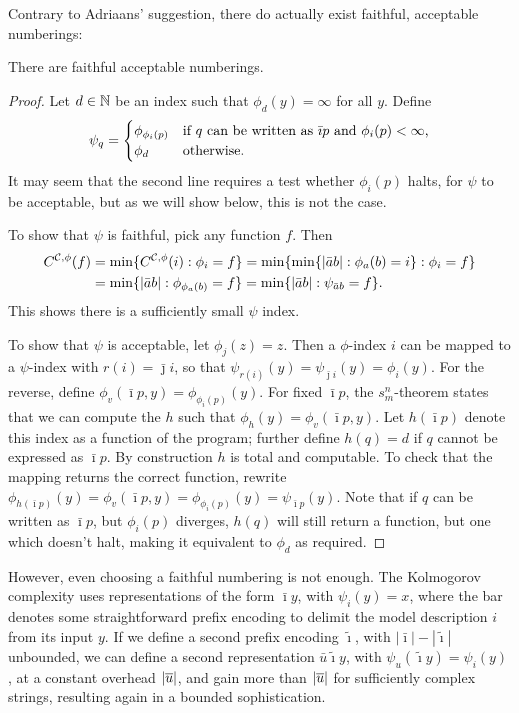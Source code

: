 
Contrary to Adriaans' suggestion, there do actually exist faithful, acceptable numberings:

\begin{lemma}\label{lemma:faithful-numberings}
  There are faithful acceptable numberings.
\end{lemma}

\begin{proof}
Let $d \in {\mathbb N}$ be an index such that $\phi_d(y)=\infty$ for all $y$. Define
\[
\psi_q=\begin{cases}
\phi_{\phi_i(p)}&\textnormal{if $q$ can be written as $\bar\imath p$ and $\phi_i(p)<\infty$,}\\
\phi_d&\textnormal{otherwise.}\end{cases}
\]
It may seem that the second line requires a test whether $\phi_i(p)$ halts, for $\psi$ to be acceptable, but as we will show below, this is not the case.  
  
To show that $\psi$ is faithful, pick any function $f$. Then
\[\begin{split}
C^{{\cal C}, \phi}(f)&=\min\{C^{{\cal C}, \phi}(i):\phi_i=f\} =\min\{\min\{|\bar a b|:\phi_a(b)=i\}:\phi_i=f\} \\
& =\min\{|\bar a b|:\phi_{\phi_a(b)}=f\}
 =\min\{|\bar a b|:\psi_{\bar a b}=f\}.
\end{split}\]
This shows there is a sufficiently small $\psi$ index.

To show that $\psi$ is acceptable, let $\phi_j(z)=z$. Then a $\phi$-index $i$ can be mapped to a $\psi$-index
with $r(i)=\bar\jmath i$, so that
$\psi_{r(i)}(y)=\psi_{\bar\jmath i}(y)=\phi_i(y)$. For the reverse,
define $\phi_v(\bar\imath p, y)=\phi_{\phi_i(p)}(y)$. For fixed
$\bar\imath p$, the 
$s^n_m$-theorem \cite{kleene193notation} states that we can compute the $h$
such that $\phi_h(y)=\phi_v(\bar\imath p,y)$. Let $h(\bar\imath p)$
denote this index as a function of the program; further define
$h(q)=d$ if $q$ cannot be expressed as $\bar\imath p$. By
construction $h$ is total and computable. To check that the mapping
returns the correct function, rewrite $\phi_{h(\bar\imath
  p)}(y)=\phi_v(\bar\imath p,y)=\phi_{\phi_i(p)}(y)=\psi_{\bar\imath p}(y)$.
Note that if $q$ can be written as $\bar \imath p$, but $\phi_i(p)$ diverges, $h(q)$ will still return a function, but one which doesn't halt, making it equivalent to $\phi_d$ as required. 
\end{proof}

However, even choosing a faithful numbering is not enough. The Kolmogorov complexity uses representations of the form $\bar\imath y$, with $\psi_i(y) = x$,  where the bar denotes some straightforward prefix encoding to delimit the model description $i$ from its input $y$. If we define a second prefix encoding $\tilde{\imath}$, with $|\bar\imath|-|\tilde\imath|$ unbounded, we can define a second representation $\bar u \tilde \imath y$, with $\psi_u(\tilde{\imath} y) = \psi_i(y)$, at a constant overhead $|\overline{u}|$, and gain more than $|\overline{u}|$ for sufficiently complex strings, resulting again in a bounded sophistication.

